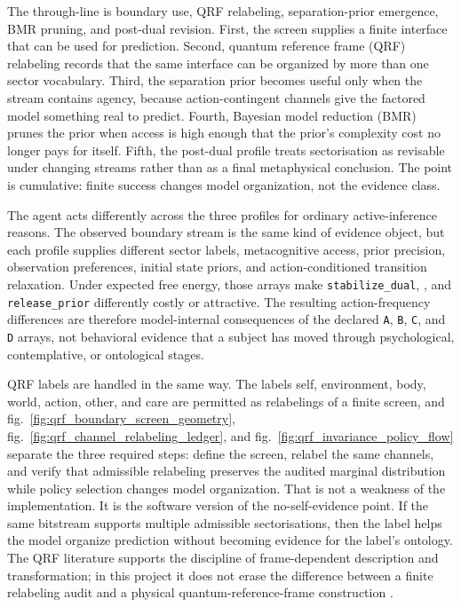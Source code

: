 \documentclass[
]{article}
\begin{document}
The through-line is boundary use, QRF relabeling, separation-prior
emergence, BMR pruning, and post-dual revision. First, the screen
supplies a finite interface that can be used for prediction. Second,
quantum reference frame (QRF) relabeling records that the same interface
can be organized by more than one sector vocabulary. Third, the
separation prior becomes useful only when the stream contains agency,
because action-contingent channels give the factored model something
real to predict. Fourth, Bayesian model reduction (BMR) prunes the prior
when access is high enough that the prior's complexity cost no longer
pays for itself. Fifth, the post-dual profile treats sectorisation as
revisable under changing streams rather than as a final metaphysical
conclusion. The point is cumulative: finite success changes model
organization, not the evidence class.

The agent acts differently across the three profiles for ordinary
active-inference reasons. The observed boundary stream is the same kind
of evidence object, but each profile supplies different sector labels,
metacognitive access, prior precision, observation preferences, initial
state priors, and action-conditioned transition relaxation. Under
expected free energy, those arrays make \texttt{stabilize\_dual},
, and \texttt{release\_prior} differently
costly or attractive. The resulting action-frequency differences are
therefore model-internal consequences of the declared \texttt{A},
\texttt{B}, \texttt{C}, and \texttt{D} arrays, not behavioral evidence
that a subject has moved through psychological, contemplative, or
ontological stages.

QRF labels are handled in the same way. The labels self, environment,
body, world, action, other, and care are permitted as relabelings of a
finite screen, and fig.~\ref{fig:qrf_boundary_screen_geometry},
fig.~\ref{fig:qrf_channel_relabeling_ledger}, and
fig.~\ref{fig:qrf_invariance_policy_flow} separate the three required
steps: define the screen, relabel the same channels, and verify that
admissible relabeling preserves the audited marginal distribution while
policy selection changes model organization. That is not a weakness of
the implementation. It is the software version of the no-self-evidence
point. If the same bitstream supports multiple admissible
sectorisations, then the label helps the model organize prediction
without becoming evidence for the label's ontology. The QRF literature
supports the discipline of frame-dependent description and
transformation; in this project it does not erase the difference between
a finite relabeling audit and a physical quantum-reference-frame
construction
\citep{giacomini2019qrf, vanrietvelde2020perspective, bartlett2007reference}.
\end{document}
